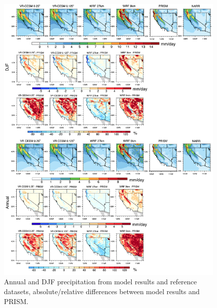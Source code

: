 \begin{figure}
\begin{center}
\includegraphics[width=6in]{pr_DJF_Annual.pdf}
\end{center}
\caption{Annual and DJF precipitation from model results and reference datasets, absolute/relative differences between model results and PRISM.} \label{fig:Figure 9}
\end{figure}


